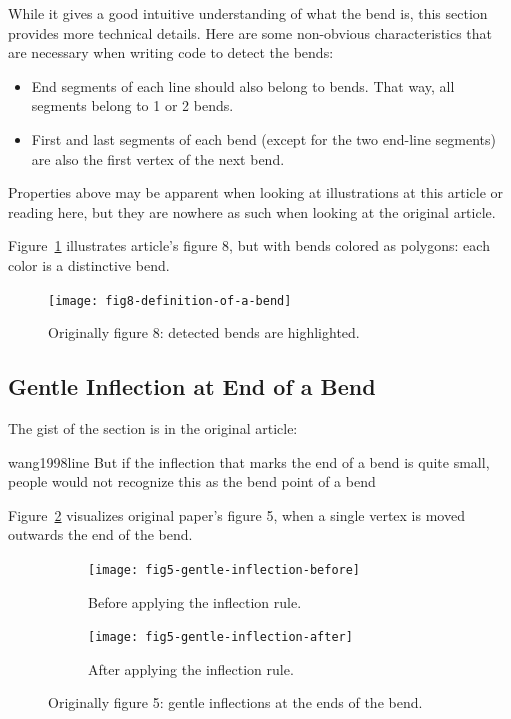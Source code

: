 \documentclass[a4paper]{article}
\begin{document}
While it gives a good intuitive understanding of what the bend is, this section
provides more technical details. Here are some non-obvious characteristics that
are necessary when writing code to detect the bends:

\begin{itemize}
    \item End segments of each line should also belong to bends. That way, all
        segments belong to 1 or 2 bends.

    \item First and last segments of each bend (except for the two end-line
        segments) are also the first vertex of the next bend.
\end{itemize}

Properties above may be apparent when looking at illustrations at this article
or reading here, but they are nowhere as such when looking at the original
article.

Figure~\ref{fig:fig8-definition-of-a-bend} illustrates article's figure 8,
but with bends colored as polygons: each color is a distinctive bend.

\begin{figure}[h]
    \centering
    \texttt{[image: fig8-definition-of-a-bend]}
    \caption{Originally figure 8: detected bends are highlighted.}
    \label{fig:fig8-definition-of-a-bend}
\end{figure}

\subsection{Gentle Inflection at End of a Bend}

The gist of the section is in the original article:

\begin{displaycquote}{wang1998line}
    But if the inflection that marks the end of a bend is quite small, people
    would not recognize this as the bend point of a bend
\end{displaycquote}

Figure~\ref{fig:fig5-gentle-inflection} visualizes original paper's figure 5,
when a single vertex is moved outwards the end of the bend.

\begin{figure}[h]
    \centering
    \begin{subfigure}[b]{.49\textwidth}
        \texttt{[image: fig5-gentle-inflection-before]}
        \caption{Before applying the inflection rule.}
    \end{subfigure}
    \hfill
    \begin{subfigure}[b]{.49\textwidth}
        \texttt{[image: fig5-gentle-inflection-after]}
        \caption{After applying the inflection rule.}
    \end{subfigure}
    \caption{Originally figure 5: gentle inflections at the ends of the bend.}
    \label{fig:fig5-gentle-inflection}
\end{figure}
\end{document}
